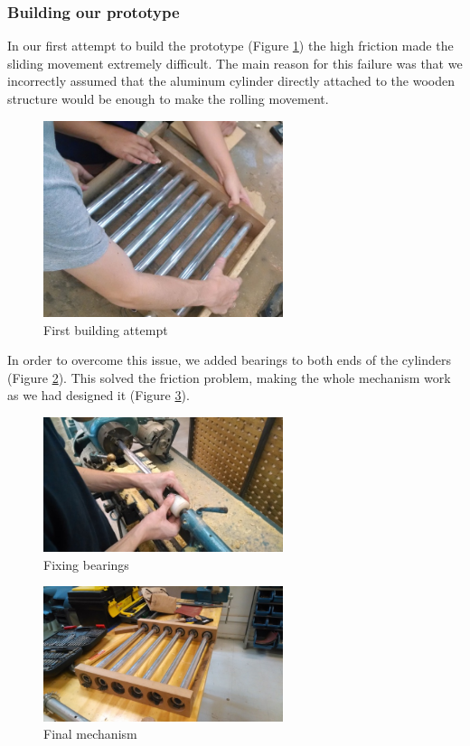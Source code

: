 \subsubsection{Building our prototype}
In our first attempt to build the prototype (Figure \ref{fig:first_attempt}) the high friction made the sliding movement extremely difficult. The main reason for this failure was that we incorrectly assumed that the aluminum cylinder directly attached to the wooden structure would be enough to make the rolling movement. \\

\begin{figure}[h]
\centering
\includegraphics[width=7cm]{brazil_images/image039.jpg}
\caption{First building attempt}
\label{fig:first_attempt}
\end{figure}


In order to overcome this issue, we added bearings to both ends of the cylinders (Figure \ref{fig:fixing_bearings}). This solved the friction problem, making the whole mechanism work as we had designed it (Figure \ref{fig:final_mechanism}).	


\begin{figure}[h]
\centering
\includegraphics[width=7cm]{brazil_images/image040.jpg}
\caption{Fixing bearings}
\label{fig:fixing_bearings}
\end{figure}


\begin{figure}[h]
\centering
\includegraphics[width=7cm]{brazil_images/image042.jpg}
\caption{Final mechanism}
\label{fig:final_mechanism}
\end{figure}


